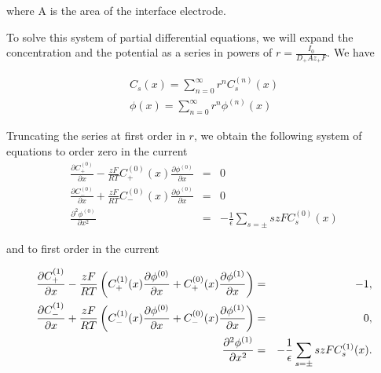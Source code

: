 where A is the area of the interface electrode. 

To solve this system of partial differential equations, we will expand the concentration and the potential as a series in powers of $r = \frac{I_0}{D_+Az_+ F}$. We have

\begin{eqnarray}
C_s(x) = \sum_{n=0}^{\infty}r^n C_s^{(n)}(x)\\
\phi(x) = \sum_{n=0}^{\infty}r^n \phi^{(n)}(x)
\end{eqnarray}

Truncating the series at first order in $r$, we obtain the following system of equations to order zero in the current
\begin{eqnarray}
\frac{\partial C^{(0)}_+}{\partial x}-\frac{zF}{RT}C^{(0)}_+(x)\frac{\partial \phi^{(0)}}{\partial x} &=& 0\\
\label{eq:concentration-diff-zero1}
\frac{\partial C^{(0)}_-}{\partial x}+\frac{zF}{RT}C^{(0)}_-(x)\frac{\partial \phi^{(0)}}{\partial x}&=& 0\\
\label{eq:concentration-diff-zero2}
\frac{\partial^2  \phi^{(0)}}{\partial x^2} &=& -\frac{1}{\epsilon}\sum_{s= \pm} szF C^{(0)}_{s}(x)
\label{eq:concentration-diff-zero3}
\end{eqnarray}

and to first order in the current

\begin{eqnarray}
\frac{\partial C^{(1)}_+}{\partial x}-\frac{zF}{RT}\left({C^{(1)}_+(x)\frac{\partial \phi^{(0)}}{\partial x}+C^{(0)}_+(x)\frac{\partial \phi^{(1)}}{\partial x}}\right) &=& -1,\\
\label{eq:concentration-diff-first1}
\frac{\partial C^{(1)}_-}{\partial x}+\frac{zF}{RT}\left({C^{(1)}_-(x)\frac{\partial \phi^{(0)}}{\partial x}+C^{(0)}_-(x)\frac{\partial \phi^{(1)}}{\partial x}}\right)&=& 0,\\
\label{eq:concentration-diff-first2}
\frac{\partial^2  \phi^{(1)}}{\partial x^2} &=& -\frac{1}{\epsilon}\sum_{s= \pm} szF C^{(1)}_{s}(x).
\label{eq:concentration-diff-first3}
\end{eqnarray}





















